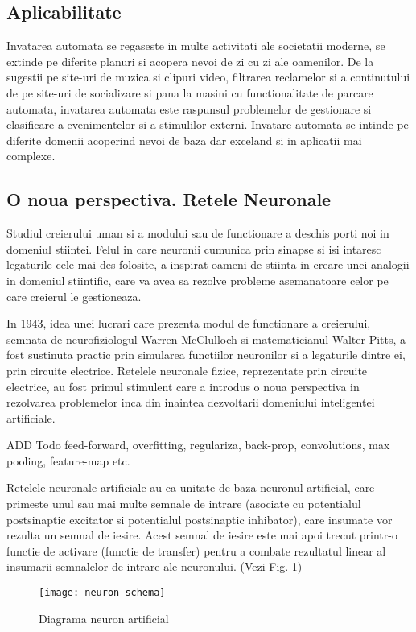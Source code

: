 	\subsection{Aplicabilitate}
	Invatarea automata se regaseste in multe activitati ale societatii moderne, se extinde pe diferite planuri si acopera nevoi de zi cu zi ale oamenilor. De la sugestii pe site-uri de muzica si clipuri video, filtrarea reclamelor si a continutului de pe site-uri de socializare  si pana la masini cu functionalitate de parcare automata, invatarea automata este raspunsul problemelor de gestionare si clasificare a evenimentelor si a stimulilor externi. 
	Invatare automata se intinde pe diferite domenii acoperind nevoi de baza dar exceland si in aplicatii mai complexe.
	
	\vfill
	
	\subsection{O noua perspectiva. Retele Neuronale}
	Studiul creierului uman si a modului sau de functionare a deschis porti noi in domeniul stiintei. Felul in care neuronii cumunica prin sinapse si isi intaresc legaturile cele mai des folosite, a inspirat oameni de stiinta in creare unei analogii in domeniul stiintific, care va avea sa rezolve probleme asemanatoare celor pe care creierul le gestioneaza.
	
	In 1943, idea unei  lucrari care prezenta modul de functionare a creierului, semnata de  neurofiziologul Warren McClulloch si matematicianul Walter Pitts,   a fost sustinuta practic prin simularea functiilor neuronilor si a legaturile dintre ei, prin circuite electrice. Retelele neuronale fizice, reprezentate prin circuite electrice, au fost primul stimulent care a introdus o noua perspectiva in rezolvarea problemelor inca din inaintea dezvoltarii domeniului inteligentei artificiale. 
	
	
	
	ADD Todo feed-forward, overfitting, regulariza, back-prop, convolutions, max pooling, feature-map etc.
	
	Retelele neuronale artificiale au ca unitate de baza neuronul artificial, care primeste unul sau mai multe semnale de intrare (asociate cu potentialul postsinaptic excitator si potentialul postsinaptic inhibator), care insumate vor rezulta un semnal de iesire. Acest semnal de iesire este mai apoi trecut printr-o functie de activare (functie de transfer) pentru a combate rezultatul linear al insumarii semnalelor de intrare ale neuronului. (Vezi Fig. \ref{fig:neuron-schema})
	
	\begin{figure}[H]
		\texttt{[image: neuron-schema]}  
		\caption{\label{fig:neuron-schema} Diagrama neuron artificial 
		\protect 
		\footnotemark}
	\end{figure}

